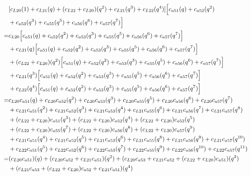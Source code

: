 \documentclass[12pt]{article}
\begin{document}
\begin{align}
    &[ c_{L20}(1) + c_{L21}(q)  + (c_{L22} +  c_{L20})(q^2) + c_{L21}(q^3)  + c_{L22}(q^4)]\Bigl[ c_{a51}(q) + c_{a52}(q^2) \nonumber\\
    &+  c_{a53}(q^3) + c_{a55}(q^5) + c_{a56}(q^6)+  c_{a57}(q^7) \Bigr]\\
    =& c_{L20}\Bigl[ c_{a51}(q) + c_{a52}(q^2) +  c_{a53}(q^3) + c_{a55}(q^5) + c_{a56}(q^6)+  c_{a57}(q^7) \Bigr] \nonumber\\
    &+ c_{L21}(q)\Bigl[ c_{a51}(q) + c_{a52}(q^2) +  c_{a53}(q^3) + c_{a55}(q^5) + c_{a56}(q^6)+  c_{a57}(q^7) \Bigr] \nonumber\\
    &+ (c_{L22} +  c_{L20})(q^2)\Bigl[ c_{a51}(q) + c_{a52}(q^2) +  c_{a53}(q^3) + c_{a55}(q^5) + c_{a56}(q^6)+  c_{a57}(q^7) \Bigr] \nonumber\\
    &+ c_{L21}(q^3)\Bigl[ c_{a51}(q) + c_{a52}(q^2) +  c_{a53}(q^3) + c_{a55}(q^5) + c_{a56}(q^6)+  c_{a57}(q^7) \Bigr] \nonumber\\
    &+ c_{L22}(q^4)\Bigl[ c_{a51}(q) + c_{a52}(q^2) +  c_{a53}(q^3) + c_{a55}(q^5) + c_{a56}(q^6)+  c_{a57}(q^7) \Bigr] \\
    =&  c_{L20}c_{a51}(q) + c_{L20}c_{a52}(q^2) +  c_{L20}c_{a53}(q^3) + c_{L20}c_{a55}(q^5) + c_{L20}c_{a56}(q^6)+  c_{L20}c_{a57}(q^7)  \nonumber\\
    &+ c_{L21}c_{a51}(q^2) + c_{L21}c_{a52}(q^3) +  c_{L21}c_{a53}(q^4) + c_{L21}c_{a55}(q^6) + c_{L21}c_{a56}(q^7)+  c_{L21}c_{a57}(q^8) \nonumber\\
    &+  (c_{L22} +  c_{L20})c_{a51}(q^3) + (c_{L22} +  c_{L20})c_{a52}(q^4) +  (c_{L22} +  c_{L20})c_{a53}(q^5) \nonumber\\
    &+ (c_{L22} +  c_{L20})c_{a55}(q^7) + (c_{L22} +  c_{L20})c_{a56}(q^8)+  (c_{L22} +  c_{L20})c_{a57}(q^9)  \nonumber\\
    &+  c_{L21}c_{a51}(q^4) + c_{L21}c_{a52}(q^5) +  c_{L21}c_{a53}(q^6) + c_{L21}c_{a55}(q^8) + c_{L21}c_{a56}(q^9)+  c_{L21}c_{a57}(q^{10})  \nonumber\\
    &+  c_{L22}c_{a51}(q^5) + c_{L22}c_{a52}(q^6) +  c_{L22}c_{a53}(q^7) + c_{L22}c_{a55}(q^9) + c_{L22}c_{a56}(q^{10})+  c_{L22}c_{a57}(q^{11})  \\
    =& (c_{L20}c_{a51})(q) + (c_{L20}c_{a52} + c_{L21}c_{a51})(q^2) + (c_{L20}c_{a53} + c_{L21}c_{a52} + (c_{L22} +  c_{L20})c_{a51})(q^3) \nonumber\\
    &+ (c_{L21}c_{a53} + (c_{L22} +  c_{L20})c_{a52} + c_{L21}c_{a51})(q^4) \nonumber\\

\end{align}
\end{document}
